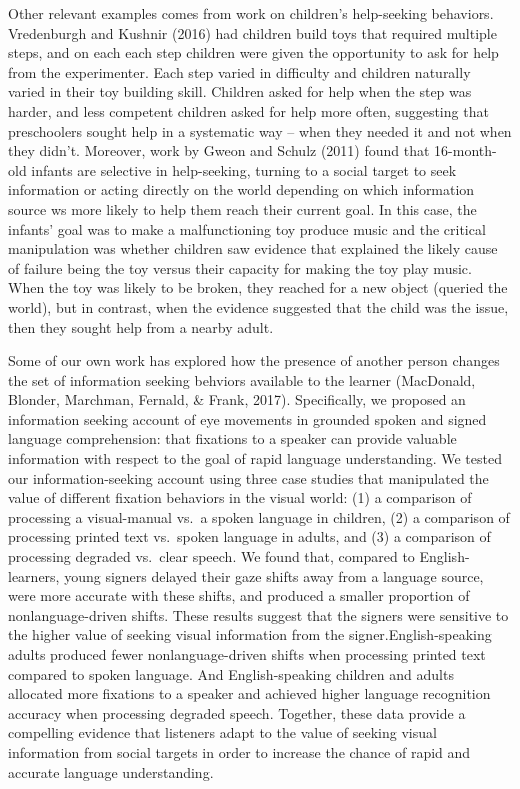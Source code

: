 \documentclass[english,floatsintext,man]{apa6}
\theoremstyle{definition}
\theoremstyle{definition}
\theoremstyle{definition}
\theoremstyle{remark}
\begin{document}
Other relevant examples comes from work on children's help-seeking
behaviors. Vredenburgh and Kushnir (2016) had children build toys that
required multiple steps, and on each each step children were given the
opportunity to ask for help from the experimenter. Each step varied in
difficulty and children naturally varied in their toy building skill.
Children asked for help when the step was harder, and less competent
children asked for help more often, suggesting that preschoolers sought
help in a systematic way -- when they needed it and not when they
didn't. Moreover, work by Gweon and Schulz (2011) found that
16-month-old infants are selective in help-seeking, turning to a social
target to seek information or acting directly on the world depending on
which information source ws more likely to help them reach their current
goal. In this case, the infants' goal was to make a malfunctioning toy
produce music and the critical manipulation was whether children saw
evidence that explained the likely cause of failure being the toy versus
their capacity for making the toy play music. When the toy was likely to
be broken, they reached for a new object (queried the world), but in
contrast, when the evidence suggested that the child was the issue, then
they sought help from a nearby adult.

Some of our own work has explored how the presence of another person
changes the set of information seeking behviors available to the learner
(MacDonald, Blonder, Marchman, Fernald, \& Frank, 2017). Specifically,
we proposed an information seeking account of eye movements in grounded
spoken and signed language comprehension: that fixations to a speaker
can provide valuable information with respect to the goal of rapid
language understanding. We tested our information-seeking account using
three case studies that manipulated the value of different fixation
behaviors in the visual world: (1) a comparison of processing a
visual-manual vs.~a spoken language in children, (2) a comparison of
processing printed text vs.~spoken language in adults, and (3) a
comparison of processing degraded vs.~clear speech. We found that,
compared to English-learners, young signers delayed their gaze shifts
away from a language source, were more accurate with these shifts, and
produced a smaller proportion of nonlanguage-driven shifts. These
results suggest that the signers were sensitive to the higher value of
seeking visual information from the signer.English-speaking adults
produced fewer nonlanguage-driven shifts when processing printed text
compared to spoken language. And English-speaking children and adults
allocated more fixations to a speaker and achieved higher language
recognition accuracy when processing degraded speech. Together, these
data provide a compelling evidence that listeners adapt to the value of
seeking visual information from social targets in order to increase the
chance of rapid and accurate language understanding.
\end{document}
